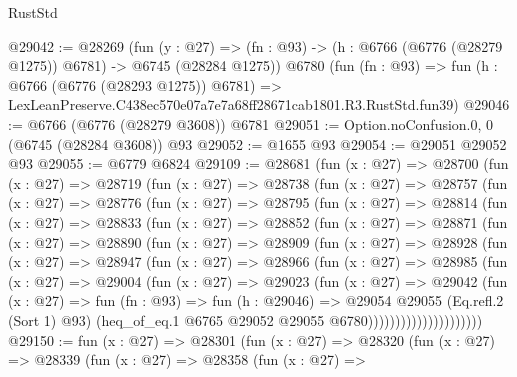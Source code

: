 \begin{lexlean}{RustStd}
\begin{coremodule}
@29042 := @28269
    (fun (y : @27) =>
    (fn : @93) -> (h : @6766 (@6776 (@28279 @1275)) @6781) -> @6745 (@28284 @1275))
    @6780
    (fun (fn : @93) =>
    fun (h : @6766 (@6776 (@28293 @1275)) @6781) =>
    LexLeanPreserve.C438ec570e07a7e7a68ff28671cab1801.R3.RustStd.fun39)
@29046 := @6766 (@6776 (@28279 @3608)) @6781
@29051 := Option.noConfusion.{0, 0} (@6745 (@28284 @3608)) @93
@29052 := @1655 @93
@29054 := @29051 @29052 @93
@29055 := @6779 @6824
@29109 := @28681
    (fun (x : @27) =>
    @28700
      (fun (x : @27) =>
      @28719
        (fun (x : @27) =>
        @28738
          (fun (x : @27) =>
          @28757
            (fun (x : @27) =>
            @28776
              (fun (x : @27) =>
              @28795
                (fun (x : @27) =>
                @28814
                  (fun (x : @27) =>
                  @28833
                    (fun (x : @27) =>
                    @28852
                      (fun (x : @27) =>
                      @28871
                        (fun (x : @27) =>
                        @28890
                          (fun (x : @27) =>
                          @28909
                            (fun (x : @27) =>
                            @28928
                              (fun (x : @27) =>
                              @28947
                                (fun (x : @27) =>
                                @28966
                                  (fun (x : @27) =>
                                  @28985
                                    (fun (x : @27) =>
                                    @29004
                                      (fun (x : @27) =>
                                      @29023
                                        (fun (x : @27) =>
                                        @29042
                                          (fun (x : @27) =>
                                          fun (fn : @93) =>
                                          fun (h : @29046) =>
                                          @29054
                                            @29055
                                            (Eq.refl.{2} (Sort 1) @93)
                                            (heq_of_eq.{1}
                                              @6765
                                              @29052
                                              @29055
                                              @6780)))))))))))))))))))))
@29150 := fun (x : @27) =>
  @28301
    (fun (x : @27) =>
    @28320
      (fun (x : @27) =>
      @28339
        (fun (x : @27) =>
        @28358
          (fun (x : @27) =>

\end{coremodule}
\end{lexlean}
